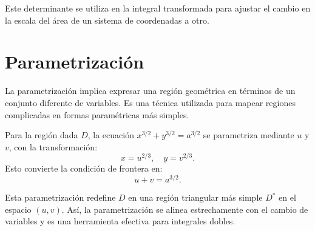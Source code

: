 Este determinante se utiliza en la integral transformada para ajustar el cambio en la escala del área de un sistema de coordenadas a otro.

\section*{Parametrización}

La parametrización implica expresar una región geométrica en términos de un conjunto diferente de variables. Es una técnica utilizada para mapear regiones complicadas en formas paramétricas más simples.

Para la región dada \( D \), la ecuación \( x^{3/2} + y^{3/2} = a^{3/2} \) se parametriza mediante \( u \) y \( v \), con la transformación:
\[
x = u^{2/3}, \quad y = v^{2/3}.
\]
Esto convierte la condición de frontera en:
\[
u + v = a^{3/2}.
\]

Esta parametrización redefine \( D \) en una región triangular más simple \( D^* \) en el espacio \( (u, v) \). Así, la parametrización se alinea estrechamente con el cambio de variables y es una herramienta efectiva para integrales dobles.

